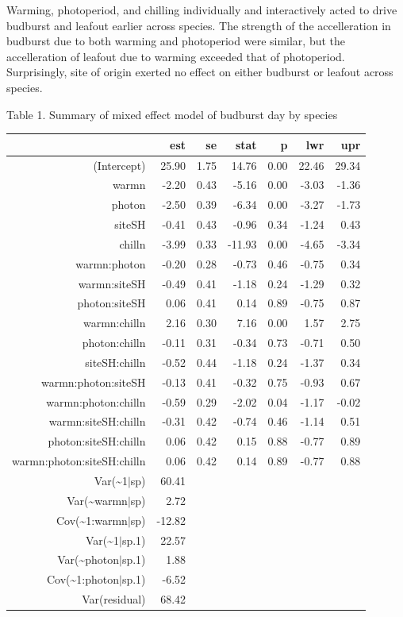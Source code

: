 \documentclass[11pt]{article}
\begin{document}

Warming, photoperiod, and chilling individually and interactively acted to drive budburst  and leafout earlier across species. The strength of the accelleration in budburst due to both warming and photoperiod were similar, but the accelleration of leafout due to warming exceeded that of photoperiod. Surprisingly, site of origin exerted no effect on either budburst or leafout across species.

Table 1. Summary of mixed effect model of budburst day by species

\begin{table}[ht]
\centering
\begin{tabular}{rrrrrrr}
  \hline
 & est & se & stat & p & lwr & upr \\ 
  \hline
(Intercept) & 25.90 & 1.75 & 14.76 & 0.00 & 22.46 & 29.34 \\ 
  warmn & -2.20 & 0.43 & -5.16 & 0.00 & -3.03 & -1.36 \\ 
  photon & -2.50 & 0.39 & -6.34 & 0.00 & -3.27 & -1.73 \\ 
  siteSH & -0.41 & 0.43 & -0.96 & 0.34 & -1.24 & 0.43 \\ 
  chilln & -3.99 & 0.33 & -11.93 & 0.00 & -4.65 & -3.34 \\ 
  warmn:photon & -0.20 & 0.28 & -0.73 & 0.46 & -0.75 & 0.34 \\ 
  warmn:siteSH & -0.49 & 0.41 & -1.18 & 0.24 & -1.29 & 0.32 \\ 
  photon:siteSH & 0.06 & 0.41 & 0.14 & 0.89 & -0.75 & 0.87 \\ 
  warmn:chilln & 2.16 & 0.30 & 7.16 & 0.00 & 1.57 & 2.75 \\ 
  photon:chilln & -0.11 & 0.31 & -0.34 & 0.73 & -0.71 & 0.50 \\ 
  siteSH:chilln & -0.52 & 0.44 & -1.18 & 0.24 & -1.37 & 0.34 \\ 
  warmn:photon:siteSH & -0.13 & 0.41 & -0.32 & 0.75 & -0.93 & 0.67 \\ 
  warmn:photon:chilln & -0.59 & 0.29 & -2.02 & 0.04 & -1.17 & -0.02 \\ 
  warmn:siteSH:chilln & -0.31 & 0.42 & -0.74 & 0.46 & -1.14 & 0.51 \\ 
  photon:siteSH:chilln & 0.06 & 0.42 & 0.15 & 0.88 & -0.77 & 0.89 \\ 
  warmn:photon:siteSH:chilln & 0.06 & 0.42 & 0.14 & 0.89 & -0.77 & 0.88 \\ 
           Var(\~{}1$|$sp) & 60.41 &  &  &  &  &  \\ 
       Var(\~{}warmn$|$sp) & 2.72 &  &  &  &  &  \\ 
     Cov(\~{}1:warmn$|$sp) & -12.82 &  &  &  &  &  \\ 
         Var(\~{}1$|$sp.1) & 22.57 &  &  &  &  &  \\ 
    Var(\~{}photon$|$sp.1) & 1.88 &  &  &  &  &  \\ 
  Cov(\~{}1:photon$|$sp.1) & -6.52 &  &  &  &  &  \\ 
        Var(residual) & 68.42 &  &  &  &  &  \\ 
   \hline
\end{tabular}
\end{table}
\end{document}
